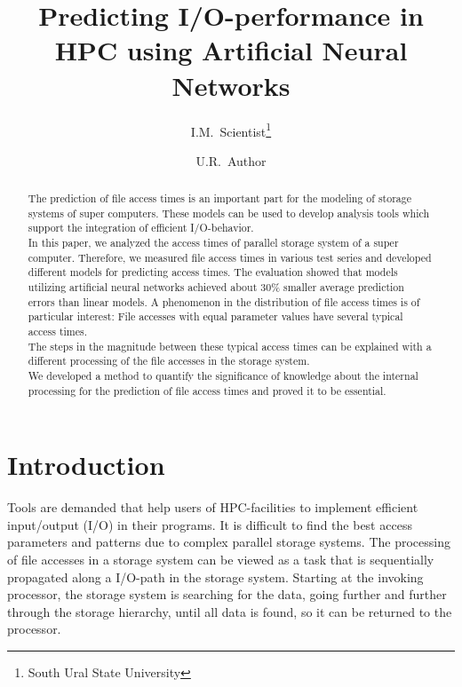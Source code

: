 \documentclass{superfri}
\begin{document}
\author{I.M.~Scientist\footnote{\label{susu}South Ural State University} \and U.R.~Author}

\title{Predicting I/O-performance in HPC using Artificial Neural Networks}

\maketitle{}

\begin{abstract} %
	
The prediction of file access times is an important part for the modeling of storage systems of super computers. These models can be used to develop analysis tools which support the integration of efficient I/O-behavior.\\
In this paper, we analyzed the access times of parallel storage system of a super computer.
Therefore, we measured file access times in various test series and developed different models for predicting access times. The evaluation showed that models utilizing artificial neural networks achieved about 30\% smaller average prediction errors than linear models. 
A phenomenon in the distribution of file access times is of particular interest:
File accesses with equal parameter values have several typical access times.\\
The steps in the magnitude between these typical access times can be explained with a different processing of the file accesses in the storage system.\\
We developed a method to quantify the significance of knowledge about the internal processing for the prediction of file access times and proved it to be essential.

\end{abstract}

\section*{Introduction} %
\label{sec:intro}

Tools are demanded that help users of HPC-facilities to implement efficient input/output (I/O) in their programs.
It is difficult to find the best access parameters and patterns due to complex parallel storage systems.
The processing of file accesses in a storage system can be viewed as a task that is sequentially propagated along a I/O-path in the storage system.
Starting at the invoking processor, the storage system is searching for the data, going further and further through the storage hierarchy, until all data is found, so it can be returned to the processor.
\end{document}
